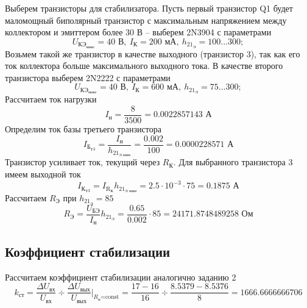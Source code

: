 \documentclass[a4paper, 12pt]{article}
\begin{document}
    Выберем транзисторы для стабилизатора. Пусть первый транзистор Q1 будет
    маломощный биполярный транзистор с максимальным напряжением между коллектором и эмиттером более 30 В -- выберем 2N3904 с параметрами
    $$
    U_{\text{КЭ}_\text{макс}}=40\text{ В},\ I_\text{К}=200\text{ мА},\ h_{21_\text{Э}}=100...300;
    $$
    Возьмем такой же транзистор в качестве выходного (транзистор 3), так как его ток коллектора больше максимального выходного тока. В качестве второго транзистора
    выберем 2N2222 с параметрами
    $$
    U_{\text{КЭ}_\text{макс}}=40\text{ В},\ I_\text{К}=600\text{ мА},\ h_{21_\text{Э}}=75...300;
    $$
    Рассчитаем ток нагрузки
    $$
    I_\text{н}=\dfrac{8}{3500}=0.0022857143\text{ А}
    $$
    Определим ток базы третьего транзистора
    $$
    I_{\text{Б}_\text{Т3}}=\dfrac{I_\text{н}}{h_{21_\text{Э мин}}}=\dfrac{0.002}{100}=0.0000228571\text{ А}
    $$
    Транзистор усиливает ток, текущий через $R_\text{К}$. Для выбранного транзистора 3 имеем выходной ток
    $$
    I_{\text{К}_\text{Т3}}=I_{\text{R}_\text{К}}h_{21_\text{Э мин}}=2.5\cdot10^{-3}\cdot75=0.1875\text{ А}
    $$
    Рассчитаем $R_\text{Э}$ при $h_{21_\text{Э}}=85$
    $$
    R_\text{Э}=\dfrac{U_\text{БЭ}}{I_\text{н}}h_{21_\text{Э}}=\dfrac{0.65}{0.002}\cdot85=24171.8748489258\text{ Ом}
    $$


    \subsection{Коэффициент стабилизации}
    Рассчитаем коэффициент стабилизации аналогично заданию 2
    $$
    k_{\text{ст}}=\dfrac{\Delta U_{\text{вх}}}{U_{\text{вх}}}\div\dfrac{\Delta U_{\text{вых}}}{U_{\text{вых}}}\bigg|_{R_\text{н}\text{=const}}=\dfrac{17-16}{16}\div\dfrac{8.5379-8.5376}{8}=1666.6666666706
    $$
\end{document}

